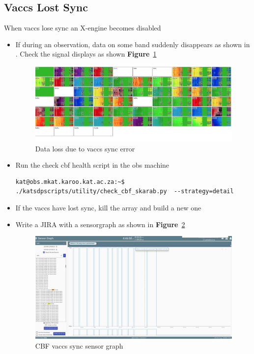 \subsection{ Vaccs Lost Sync}
When vaccs lose sync an X-engine becomes disabled
\begin{itemize}

	\item{} If during an observation, data on some band suddenly disappears as shown in . Check the signal displays as shown \textbf{Figure}~\ref{fig:image24}
	\begin{figure}[!thb]
		\centering
		\includegraphics[scale=0.26]{Chapters/images/image24.png}
		
		\caption{Data loss due to vaccs sync error}
		\label{fig:image24}
	\end{figure}

\item{} Run the check cbf health script in the obs machine
\begin{lstlisting}[style=DOS]
kat@obs.mkat.karoo.kat.ac.za:~$ ./katsdpscripts/utility/check_cbf_skarab.py  --strategy=detail
\end{lstlisting}

\item{} If the vaccs have lost sync, kill the array and build a new one
\item{} Write a JIRA with a sensorgraph as shown in \textbf{Figure}~\ref{fig:image79}



\begin{figure}[!thb]
	\centering
	\includegraphics[scale=0.26]{Chapters/images/image27.png}
	
	\caption{CBF vaccs sync sensor graph}
	\label{fig:image79}
\end{figure}

\end{itemize}
